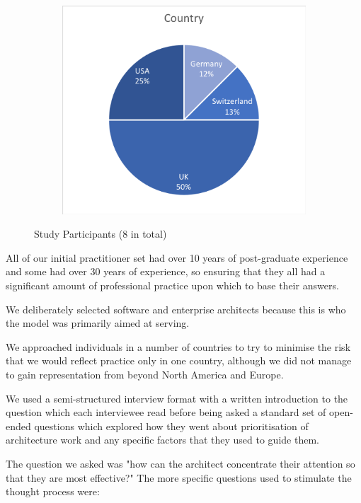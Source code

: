 \begin{figure}
\begin{subfigure}{.5\linewidth}
   \end{subfigure}
   \begin{subfigure}{\linewidth}
      \centering
      \includegraphics[scale=0.75, trim=5 5 5 5,clip]{Figures/prioritisation-countries}
   \end{subfigure}

   \caption{Study Participants (8 in total)}
   \label{figure:participants}
\end{figure}  

All of our initial practitioner set had over 10 years of post-graduate experience and some had over 30 years of experience, so ensuring that they all had a significant amount of professional practice upon which to base their answers.

We deliberately selected software and enterprise architects because this is who the model was primarily aimed at serving.

We approached individuals in a number of countries to try to minimise the risk that we would reflect practice only in one country, although we did not manage to gain representation from beyond North America and Europe.

We used a semi-structured interview format with a written introduction to the question which each interviewee read before being asked a standard set of open-ended questions which explored how they went about prioritisation of architecture work and any specific factors that they used to guide them.  

The question we asked was "how can the architect concentrate their attention so that they are most effective?" The more specific questions used to stimulate the thought process were: 

